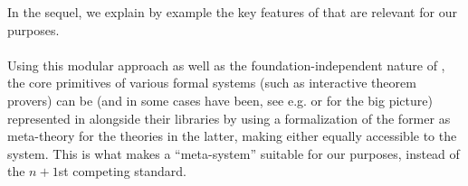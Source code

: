 %

In the sequel, we explain by example the key features of \mmt that are relevant for our purposes.


\paragraph{} Using this modular approach as well as the foundation-independent nature of \ommt, the core primitives of various formal systems (such as interactive theorem provers)
can be (and in some cases have been, see e.g. \cite{OAF:on} or \cite{KohRab:qrtpflmk15} for the big picture) represented in \ommt alongside their libraries by using a formalization of the former as 
meta-theory for the theories in the latter, making either equally accessible to the system. This is what makes \mmt a ``meta-system'' suitable for our purposes, instead of the $n+1$st competing standard.



